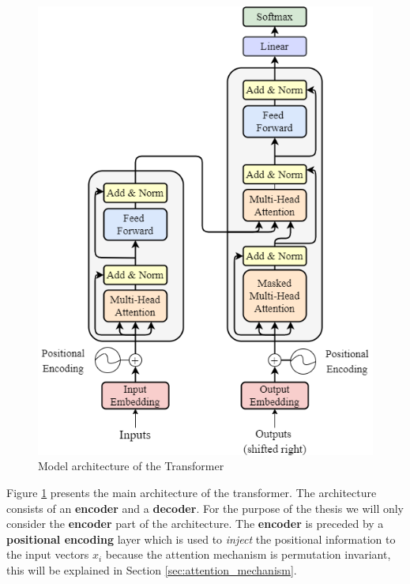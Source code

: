 \documentclass[a4paper, twoside]{report}
\theoremstyle{definition}
\numberwithin{equation}{section}
\begin{document}
\begin{figure}[h!]
    \centering
    \includegraphics[scale=0.5]{attention_is_all_you_need.png}
    \caption{Model architecture of the Transformer \cite{1706.03762}}
    \label{fig:attention_is_all_you_need}
\end{figure}

Figure \ref{fig:attention_is_all_you_need} presents the main architecture of the transformer.
The architecture consists of an \textbf{encoder} and a \textbf{decoder}.
For the purpose of the thesis we will only consider the \textbf{encoder} part of the architecture.
The \textbf{encoder} is preceded by a \textbf{positional encoding} layer which is used to \emph{inject} the positional information
to the input vectors $x_i$ because the attention mechanism is permutation invariant, this will be explained in Section \ref{sec:attention_mechanism}.

\end{document}
